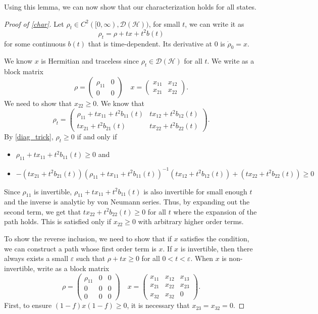 \documentclass[11pt,reqno]{amsart}
\theoremstyle{definition}
\newcommand{\mc}{\mathcal}
\newcommand{\inv}{^{-1}}
\begin{document}
Using this lemma, we can now show that our characterization holds for all states. 
\begin{proof}[Proof of \cref{char}]
    Let $\rho_t \in C^2([0,\infty),\mc D(\mc{H}))$, for small $t$, we can write it as 
    $$\rho_t=\rho+tx+ t^2b(t)$$ for some continuous $b(t)$ that is time-dependent. Its derivative at $0$ is $\dot \rho_0 =x$.

    We know $x$ is Hermitian and traceless since $\rho_t\in \mc D(\mc{H})$ for all $t$. We write as a block matrix
    $$\rho=\begin{pmatrix}
        \rho_{11} & 0\\
        0 & 0
    \end{pmatrix}\quad x=\begin{pmatrix}
        x_{11} & x_{12}\\
        x_{21} & x_{22}
    \end{pmatrix}.$$
    We need to show that $x_{22}\geq 0$. We know that 
    $$\rho_t=\begin{pmatrix}
        \rho_{11}+tx_{11}+t^2b_{11}(t) & tx_{12}+t^2b_{12}(t)\\
        tx_{21}+t^2b_{21}(t) & tx_{22}+t^2b_{22}(t)
    \end{pmatrix}.$$
    By \cref{diag_trick}, $\rho_t\geq 0$ if and only if
    \begin{itemize}
        \item $\rho_{11}+tx_{11}+t^2b_{11}(t)\geq 0$ and 
        \item $-(tx_{21}+t^2b_{21}(t))(\rho_{11}+tx_{11}+t^2b_{11}(t))\inv(tx_{12}+t^2b_{12}(t))+(tx_{22}+t^2b_{22}(t))\geq 0$
    \end{itemize}
    Since $\rho_{11}$ is invertible, $\rho_{11}+tx_{11}+t^2b_{11}(t)$ is also invertible for small enough $t$ and the inverse is analytic by von Neumann series. Thus, by expanding out the second term, we get that $tx_{22}+t^2b_{22}(t)\geq 0$ for all $t$ where the expansion of the path holds. This is satisfied only if $x_{22}\geq 0$ with arbitrary higher order terms.

    To show the reverse inclusion, we need to show that if $x$ satisfies the condition, we can construct a path whose first order term is $x$.
    If $x$ is invertible, then there always exists a small $\varepsilon$ such that $\rho+tx\geq 0$ for all $0<t<\varepsilon$. When $x$ is non-invertible,
    write as a block  matrix $$\rho=\begin{pmatrix}
        \rho_{11} & 0 & 0\\
        0 & 0 & 0\\
        0 & 0 & 0
    \end{pmatrix}\quad x=\begin{pmatrix}
        x_{11} & x_{12} & x_{13}\\
        x_{21} & x_{22} & x_{23}\\
        x_{32} & x_{32} & 0
    \end{pmatrix}.$$
    First, to ensure $(1-f)x(1-f)\geq 0$, it is necessary that $x_{23}=x_{32}=0$.


\end{proof}
\end{document}
